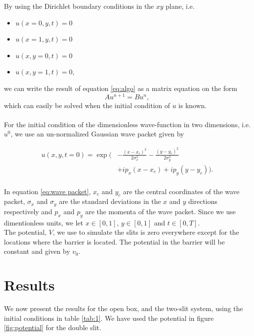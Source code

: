 \documentclass[english,notitlepage,reprint,nofootinbib]{revtex4-2}  %
\begin{document}
	\noindent
	By using the Dirichlet boundary conditions in the $xy$ plane, i.e.
	\begin{itemize}
		\item $u(x=0, y, t) = 0$
		\item $u(x=1, y, t) = 0$
		\item $u(x, y=0, t) = 0$ 
		\item $u(x, y=1, t) = 0$,
	\end{itemize}
	we can write the result of equation \ref{eq:algo} as a matrix
	equation on the form 
	\begin{equation}
	Au^{n+1} = Bu^n,	
	\end{equation} 
	which can easily be solved when the initial condition of $u$ is known.\\ \\
	\noindent
	For the initial condition of the dimensionless wave-function in two dimensions,
	i.e. $u^{0}$, we use an un-normalized Gaussian wave packet given by

	\begin{equation}\label{eq:wave packet}
	\begin{split}
		u(x,y,t=0) = \exp\Big(&-\frac{(x-x_c)^2}{2 \sigma_x^2} - \frac{(y-y_c)^2}{2 \sigma_y^2} \\
		&+ i p_x (x-x_c) + i p_y (y-y_c)\Big). \\
	\end{split}
	\end{equation}
	
	\noindent
	In equation \ref{eq:wave packet}, $x_c$ and $y_c$ are the central
	coordinates of the wave packet, $\sigma_x$ and $\sigma_y$ are the standard
	deviations in the $x$ and $y$ directions respectively and $p_x$ and $p_y$
	are the momenta of the wave packet. Since we use dimentionless units, we let 
	$x \in [0,1]$, $y \in [0,1]$ and $t \in [0,T]$.\\
	
	\noindent
	The potential, $V$, we use to simulate the slits is zero everywhere except 
	for the locations where the barrier is located. The potential in the
	barrier will be constant and given by $v_0$.    


	
	
	\section{Results}\label{sec:results}
	We now present the results for the open box, and the two-slit system, using the initial conditions in table \ref{tab:1}. We have used the potential in figure \ref{fig:potential} for the double slit.
	
\end{document}
